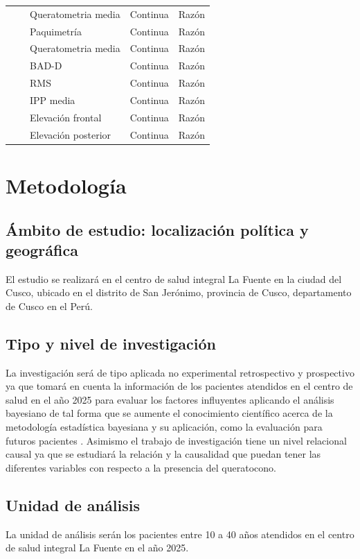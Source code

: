 \begin{landscape}
\begin{longtable}{p{4cm}p{6.5cm}p{5cm}p{3cm}p{2.5cm}}
    \cline{3-5}
    & & Queratometria media & Continua & Razón \\
    \cline{3-5}
    & & Paquimetría & Continua & Razón \\
    \cline{3-5}
    & & Queratometria media & Continua & Razón \\
    \cline{3-5}
    & & BAD-D & Continua & Razón \\
    \cline{3-5}
    & & RMS & Continua & Razón \\
    \cline{3-5}
    & & IPP media & Continua & Razón \\
    \cline{3-5}
    & & Elevación frontal & Continua & Razón \\
    \cline{3-5}
    & & Elevación posterior & Continua & Razón \\
    \hline
\end{longtable}

\end{landscape}

\section{Metodología}
\subsection{Ámbito de estudio: localización política y geográfica}
El estudio se realizará en el centro de salud integral La Fuente en la ciudad del Cusco, ubicado en el distrito de San Jerónimo, provincia de Cusco, departamento de Cusco en el Perú.

\subsection{Tipo y nivel de investigación}
La investigación será de tipo aplicada no experimental retrospectivo y prospectivo ya que tomará en cuenta la información de los pacientes atendidos en el centro de salud en el año 2025 para evaluar los factores influyentes aplicando el análisis bayesiano de tal forma que se aumente el conocimiento científico acerca de la metodología estadística bayesiana y su aplicación, como la evaluación para futuros pacientes \parencite{hernandez2004introduccion}.
Asimismo el trabajo de investigación tiene un nivel relacional causal ya que se estudiará la relación y la causalidad que puedan tener las diferentes variables con respecto a la presencia del queratocono.

\subsection{Unidad de análisis}
La unidad de análisis serán los pacientes entre 10 a 40 años atendidos en el centro de salud integral La Fuente en el año 2025.

